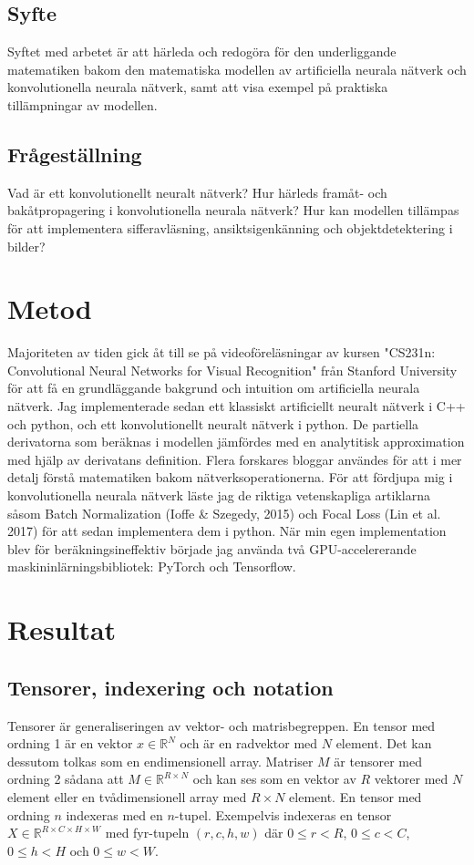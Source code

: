 \documentclass[a4paper,11pt,twoside]{article}
\begin{document}
\subsection{Syfte}
Syftet med arbetet är att härleda och redogöra för den underliggande matematiken bakom den matematiska modellen av artificiella neurala nätverk och konvolutionella neurala nätverk, samt att visa exempel på praktiska tillämpningar av modellen.

\subsection{Frågeställning}
Vad är ett konvolutionellt neuralt nätverk?
Hur härleds framåt- och bakåtpropagering i konvolutionella neurala nätverk?
Hur kan modellen tillämpas för att implementera sifferavläsning, ansiktsigenkänning och objektdetektering i bilder?


\newpage
\section{Metod}
Majoriteten av tiden gick åt till se på videoföreläsningar av kursen "CS231n: Convolutional Neural Networks for Visual Recognition" från Stanford University för att få en grundläggande bakgrund och intuition om artificiella neurala nätverk. Jag implementerade sedan ett klassiskt artificiellt neuralt nätverk i C++ och python, och ett konvolutionellt neuralt nätverk i python. De partiella derivatorna som beräknas i modellen jämfördes med en analytitisk approximation med hjälp av derivatans definition. Flera forskares bloggar användes för att i mer detalj förstå matematiken bakom nätverksoperationerna. För att fördjupa mig i konvolutionella neurala nätverk läste jag de riktiga vetenskapliga artiklarna såsom Batch Normalization (Ioffe \& Szegedy, 2015) och Focal Loss (Lin et al. 2017) för att sedan implementera dem i python. När min egen implementation blev för beräkningsineffektiv började jag använda två GPU-accelererande maskininlärningsbibliotek: PyTorch och Tensorflow. 

\newpage
\section{Resultat}


\subsection{Tensorer, indexering och notation}
Tensorer är generaliseringen av vektor- och matrisbegreppen. En tensor med ordning 1 är en vektor $x \in \mathbb{R}^N$ och är en radvektor med $N$ element. Det kan dessutom tolkas som en endimensionell array. Matriser $M$ är tensorer med ordning 2 sådana att $M \in \mathbb{R}^{R \times N}$ och kan ses som en vektor av $R$ vektorer med $N$ element eller en tvådimensionell array med $R \times N$ element. En tensor med ordning $n$ indexeras med en $n$-tupel. Exempelvis indexeras en tensor $X \in \mathbb{R}^{R \times C \times H \times W}$ med fyr-tupeln $(r,c,h,w)$ där $0 \leq r < R$, $0 \leq c < C$, $0 \leq h < H$ och $0 \leq w < W$. \cite{cs231n}
\end{document}
